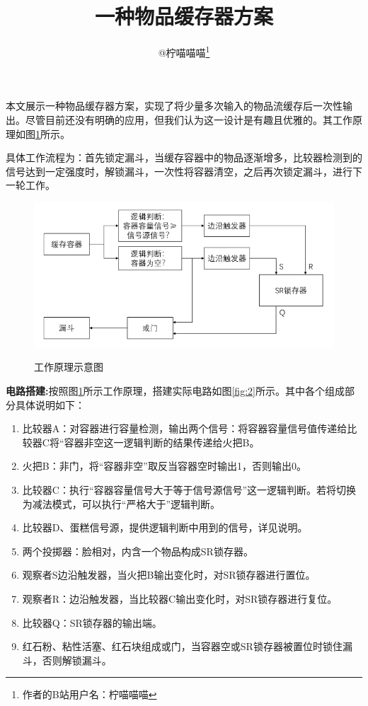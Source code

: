 \documentclass[UTF8, 12pt, punct=kaiming, fontset=none]{article}
\title{\vspace{-1.5cm}一种物品缓存器方案\vspace{-0.5cm}}
\author{\ds @柠喵喵喵\thanks{作者的B站用户名：柠喵喵喵}}
\date{}
\begin{document}
    \maketitle
    \thispagestyle{fancy} %
    \vspace{-0.7cm}

    \titleformat{\section}[hang]{\large\sffamily\bfseries}{\textmd{\ds\thesection}}{0.5cm}{}
    \titlespacing{\section}{0cm}{0.5ex}{0.2ex}
    \setcounter{section}{-1}

本文展示一种物品缓存器方案，实现了将少量多次输入的物品流缓存后一次性输出。尽管目前还没有明确的应用，但我们认为这一设计是有趣且优雅的。其工作原理如图\ref{fig:1}所示。

具体工作流程为：首先锁定漏斗，当缓存容器中的物品逐渐增多，比较器检测到的信号达到一定强度时，解锁漏斗，一次性将容器清空，之后再次锁定漏斗，进行下一轮工作。

\begin{figure}[h]
    \centering
    \includegraphics[width=.6\textwidth]{图1.png}
    \label{fig:1}
    \caption{工作原理示意图}
\end{figure}

{\bfseries 电路搭建:}按照图\ref{fig:1}所示工作原理，搭建实际电路如图\ref{fig:2}所示。其中各个组成部分具体说明如下：
\begin{enumerate}
    \item 比较器A：对容器进行容量检测，输出两个信号：将容器容量信号值传递给比较器C将“容器非空这一逻辑判断的结果传递给火把B。
    \item 火把B：非门，将“容器非空”取反当容器空时输出1，否则输出0。
    \item 比较器C：执行“容器容量信号大于等于信号源信号”这一逻辑判断。若将切换为减法模式，可以执行“严格大于”逻辑判断。
    \item 比较器D、蛋糕信号源，提供逻辑判断中用到的信号，详见说明。
    \item 两个投掷器：脸相对，内含一个物品构成SR锁存器。
    \item 观察者S边沿触发器，当火把B输出变化时，对SR锁存器进行置位。
    \item 观察者R：边沿触发器，当比较器C输出变化时，对SR锁存器进行复位。
    \item 比较器Q：SR锁存器的输出端。
    \item 红石粉、粘性活塞、红石块组成或门，当容器空或SR锁存器被置位时锁住漏斗，否则解锁漏斗。
\end{enumerate}
\end{document}
